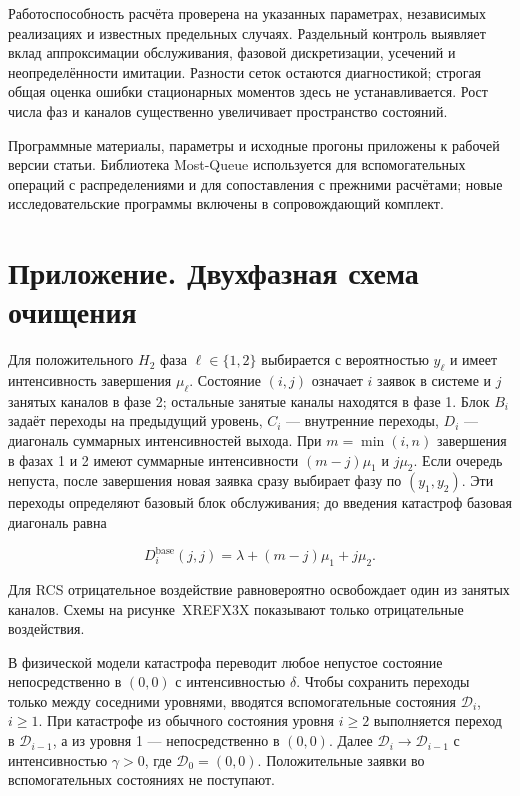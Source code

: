 Работоспособность расчёта проверена на указанных параметрах, независимых реализациях и известных предельных случаях. Раздельный контроль выявляет вклад аппроксимации обслуживания, фазовой дискретизации, усечений и неопределённости имитации. Разности сеток остаются диагностикой; строгая общая оценка ошибки стационарных моментов здесь не устанавливается. Рост числа фаз и каналов существенно увеличивает пространство состояний.

Программные материалы, параметры и исходные прогоны приложены к рабочей версии статьи. Библиотека Most-Queue \cite{mostqueue2026} используется для вспомогательных операций с распределениями и для сопоставления с прежними расчётами; новые исследовательские программы включены в сопровождающий комплект.

\clearpage
\section*{Приложение. Двухфазная схема очищения}
Для положительного \(H_2\) фаза \(\ell\in\{1,2\}\) выбирается с вероятностью \(y_\ell\) и имеет интенсивность завершения \(\mu_\ell\). Состояние \((i,j)\) означает \(i\) заявок в системе и \(j\) занятых каналов в фазе 2; остальные занятые каналы находятся в фазе 1. Блок \(B_i\) задаёт переходы на предыдущий уровень, \(C_i\) --- внутренние переходы, \(D_i\) --- диагональ суммарных интенсивностей выхода. При \(m=\min(i,n)\) завершения в фазах 1 и 2 имеют суммарные интенсивности \((m-j)\mu_1\) и \(j\mu_2\). Если очередь непуста, после завершения новая заявка сразу выбирает фазу по \((y_1,y_2)\). Эти переходы определяют базовый блок обслуживания; до введения катастроф базовая диагональ равна


\[D_i^{\mathrm{base}}(j,j)=\lambda+(m-j)\mu_1+j\mu_2.\]


Для RCS отрицательное воздействие равновероятно освобождает один из занятых каналов. Схемы на рисунке~XREFX3X показывают только отрицательные воздействия.


В физической модели катастрофа переводит любое непустое состояние непосредственно в \((0,0)\) с интенсивностью \(\delta\). Чтобы сохранить переходы только между соседними уровнями, вводятся вспомогательные состояния \(\mathcal{D}_i\), \(i\ge1\). При катастрофе из обычного состояния уровня \(i\ge2\) выполняется переход в \(\mathcal{D}_{i-1}\), а из уровня 1 --- непосредственно в \((0,0)\). Далее \(\mathcal{D}_i\to \mathcal{D}_{i-1}\) с интенсивностью \(\gamma>0\), где \(\mathcal{D}_0=(0,0)\). Положительные заявки во вспомогательных состояниях не поступают.

